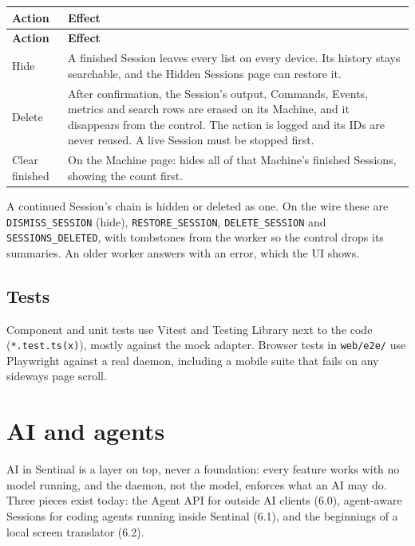\begin{small}
\begin{longtable}{>{\raggedright\arraybackslash}p{0.18\dimexpr \linewidth-4\tabcolsep\relax}>{\raggedright\arraybackslash}p{0.82\dimexpr \linewidth-4\tabcolsep\relax}}
\toprule
\textbf{Action} & \textbf{Effect} \\
\midrule
\endfirsthead
\toprule
\textbf{Action} & \textbf{Effect} \\
\midrule
\endhead
Hide & A finished Session leaves every list on every device. Its history stays searchable, and the Hidden Sessions page can restore it. \\
Delete & After confirmation, the Session's output, Commands, Events, metrics and search rows are erased on its Machine, and it disappears from the control. The action is logged and its IDs are never reused. A live Session must be stopped first. \\
Clear finished & On the Machine page: hides all of that Machine's finished Sessions, showing the count first. \\
\bottomrule
\end{longtable}
\end{small}

A continued Session's chain is hidden or deleted as one. On the wire these are \texttt{DISMISS\_\allowbreak{}SESSION} (hide), \texttt{RESTORE\_\allowbreak{}SESSION}, \texttt{DELETE\_\allowbreak{}SESSION} and \texttt{SESSIONS\_\allowbreak{}DELETED}, with tombstones from the worker so the control drops its summaries. An older worker answers with an error, which the UI shows.

\section{\texorpdfstring{Tests}{Tests}}

Component and unit tests use Vitest and Testing Library next to the code (\texttt{*.\allowbreak{}test.\allowbreak{}ts(x)}), mostly against the mock adapter. Browser tests in \texttt{web/\allowbreak{}e2e/\allowbreak{}} use Playwright against a real daemon, including a mobile suite that fails on any sideways page scroll.

\chapter{\texorpdfstring{AI and agents}{AI and agents}}

AI in Sentinal is a layer on top, never a foundation: every feature works with no model running, and the daemon, not the model, enforces what an AI may do. Three pieces exist today: the Agent API for outside AI clients (6.0), agent-aware Sessions for coding agents running inside Sentinal (6.1), and the beginnings of a local screen translator (6.2).

